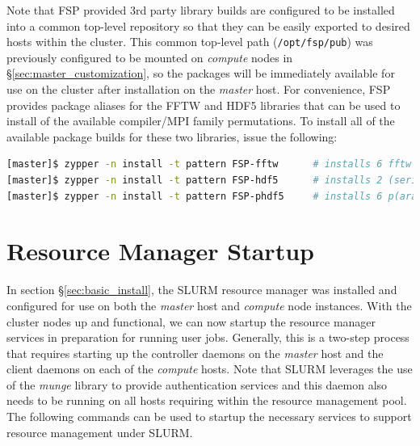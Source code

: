 \documentclass[letterpaper]{article}
\begin{document}
Note that FSP provided 3rd party library builds are configured to be installed
into a common top-level repository so that they can be easily exported to
desired hosts within the cluster. This common top-level path (\texttt{/opt/fsp/pub})
was previously configured to be mounted on {\em compute} nodes in
\S\ref{sec:master_customization}, so the packages will be immediately available
for use on the cluster after installation on the {\em master} host.  For
convenience, FSP provides package aliases for the FFTW and HDF5 libraries that
can be used to install of the available compiler/MPI family permutations. To
install all of the available package builds for these two libraries, issue the
following:

\begin{lstlisting}[language=bash]
[master]$ zypper -n install -t pattern FSP-fftw      # installs 6 fftw packages
[master]$ zypper -n install -t pattern FSP-hdf5      # installs 2 (serial) hdf5 packages
[master]$ zypper -n install -t pattern FSP-phdf5     # installs 6 p(arallel) hdf5 packages
\end{lstlisting}

\section{Resource Manager Startup}

In section \S\ref{sec:basic_install}, the SLURM resource manager was installed
and configured for use on both the {\em master} host and {\em compute} node
instances. With the cluster nodes up and functional, we can now startup the
resource manager services in preparation for running user jobs. Generally, this
is a two-step process that requires starting up the controller daemons on the {\em
  master} host and the client daemons on each of the {\em compute} hosts.  
Note that SLURM leverages the use of the {\em munge} library to provide
authentication services and this daemon also needs to be running on all hosts
requiring within the resource management pool. 
The following commands can be used to startup the necessary services to support
resource management under SLURM.
\end{document}
